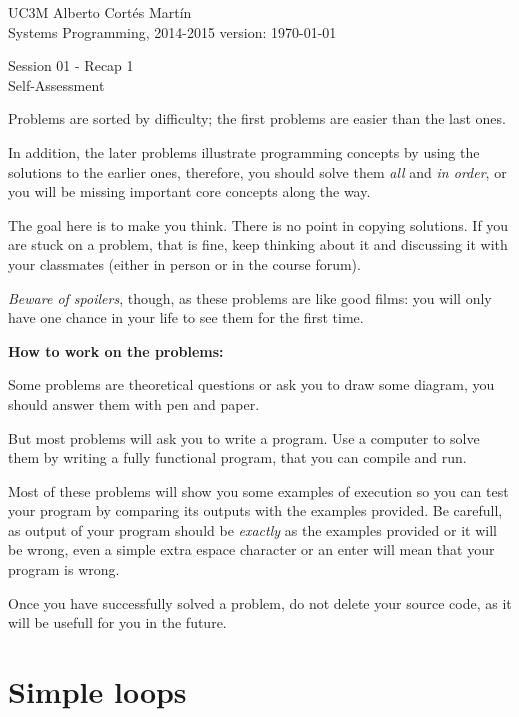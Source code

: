 \documentclass[a4paper, 12pt]{article}
\newcommand{\realtitle}{Session 01 - Recap 1}
\begin{document}
\makebox[\linewidth]{\rule{\textwidth}{0.4pt}}
UC3M \hfill Alberto Cortés Martín\\
Systems Programming, 2014-2015 \hfill version: \today\\
\makebox[\linewidth]{\rule{\textwidth}{0.4pt}}
\begin{center}
  \Large{\realtitle}\\Self-Assessment
\end{center}
\makebox[\linewidth]{\rule{\textwidth}{0.4pt}}
\vspace{1cm}

Problems are sorted by difficulty; the first problems are easier than the last
ones.

In addition, the later problems illustrate programming concepts by using the
solutions to the earlier ones, therefore, you should solve them \emph{all} and
\emph{in order}, or you will be missing important core concepts along the way.

The goal here is to make you think. There is no point in copying solutions.  If
you are stuck on a problem, that is fine, keep thinking about it and discussing
it with your classmates (either in person or in the course forum).

\emph{Beware of spoilers}, though, as these problems are like good films: you
will only have one chance in your life to see them for the first time.

\textbf{How to work on the problems:}

Some problems are theoretical questions or ask you to draw some diagram, you
should answer them with pen and paper.

But most problems will ask you to write a program. Use a computer to solve them
by writing a fully functional program, that you can compile and run.

Most of these problems will show you some examples of execution so you can test
your program by comparing its outputs with the examples provided. Be carefull,
as output of your program should be \emph{exactly} as the examples provided or
it will be wrong, even a simple extra espace character or an enter will mean
that your program is wrong.

Once you have successfully solved a problem, do not delete your source code, as
it will be usefull for you in the future.

\newpage

\section{Simple loops}
\end{document}
